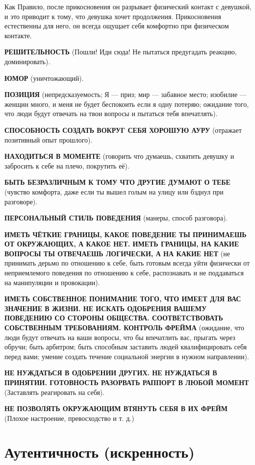 Как Правило, после прикосновения он разрывает физический контакт с девушкой, и это приводит к тому, что девушка хочет продолжения. Прикосновения естественны для него, он всегда ощущает себя комфортно при физическом контакте.

\textbf{РЕШИТЕЛЬНОСТЬ} (Пошли! Иди сюда! Не пытаться предугадать реакцию, доминировать).

\textbf{ЮМОР} (уничтожающий).

\textbf{ПОЗИЦИЯ} (непредсказуемость; Я --- приз; мир --- забавное место; изобилие --- женщин много, и меня не будет беспокоить если я одну потеряю; ожидание того, что люди будут отвечать на твои вопросы и пытаться тебя впечатлять).

\textbf{СПОСОБНОСТЬ СОЗДАТЬ ВОКРУГ СЕБЯ ХОРОШУЮ АУРУ} (отражает позитивный опыт прошлого).

\textbf{НАХОДИТЬСЯ В МОМЕНТЕ} (говорить что думаешь, схватить девушку и забросить к себе на плечо, покрутить её).

\textbf{БЫТЬ БЕЗРАЗЛИЧНЫМ К ТОМУ ЧТО ДРУГИЕ ДУМАЮТ О ТЕБЕ} (чувство комфорта, даже если ты вышел голым на улицу или бзднул при разговоре).

\textbf{ПЕРСОНАЛЬНЫЙ СТИЛЬ ПОВЕДЕНИЯ} (манеры, способ разговора).

\textbf{ИМЕТЬ ЧЁТКИЕ ГРАНИЦЫ, КАКОЕ ПОВЕДЕНИЕ ТЫ ПРИНИМАЕШЬ ОТ ОКРУЖАЮЩИХ, А КАКОЕ НЕТ. ИМЕТЬ ГРАНИЦЫ, НА КАКИЕ ВОПРОСЫ ТЫ ОТВЕЧАЕШЬ ЛОГИЧЕСКИ, А НА КАКИЕ НЕТ} (не принимать дерьмо по отношению к себе, быть готовым всегда уйти физически от неприемлемого поведения по отношению к себе, распознавать и не поддаваться на манипуляции и провокации).

\textbf{ИМЕТЬ СОБСТВЕННОЕ ПОНИМАНИЕ ТОГО, ЧТО ИМЕЕТ ДЛЯ ВАС ЗНАЧЕНИЕ В ЖИЗНИ. НЕ ИСКАТЬ ОДОБРЕНИЯ ВАШЕМУ ПОВЕДЕНИЮ СО СТОРОНЫ ОБЩЕСТВА. СООТВЕТСТВОВАТЬ СОБСТВЕННЫМ ТРЕБОВАНИЯМ. КОНТРОЛЬ ФРЕЙМА} (ожидание, что люди будут отвечать на ваши вопросы, что бы впечатлить вас, прыгать через обручи; быть арбитром; быть способным заставить людей квалифицировать себя перед вами; умение создать течение социальной энергии в нужном направлении).

\textbf{НЕ НУЖДАТЬСЯ В ОДОБРЕНИИ ДРУГИХ. НЕ НУЖДАТЬСЯ В ПРИНЯТИИ. ГОТОВНОСТЬ РАЗОРВАТЬ РАППОРТ В ЛЮБОЙ МОМЕНТ} (Заставлять реагировать на себя).

\textbf{НЕ ПОЗВОЛЯТЬ ОКРУЖАЮЩИМ ВТЯНУТЬ СЕБЯ В ИХ ФРЕЙМ} (Плохое настроение, превосходство и т. д.)
\chapter{Аутентичность (искренность)}

